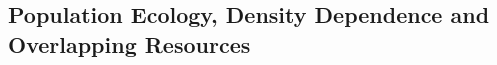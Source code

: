 \documentclass[letterpaper]{article}\usepackage[]{graphicx}\usepackage[]{color}
\begin{document}

\subsection{Population Ecology, Density Dependence and Overlapping Resources}
\label{sec:ecology_background}

\end{document}
